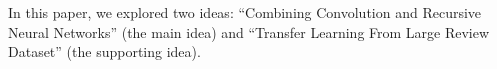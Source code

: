 In this paper, we explored two ideas: ``Combining Convolution and Recursive Neural Networks'' (the main idea) and ``Transfer Learning From Large Review Dataset'' (the supporting idea).
